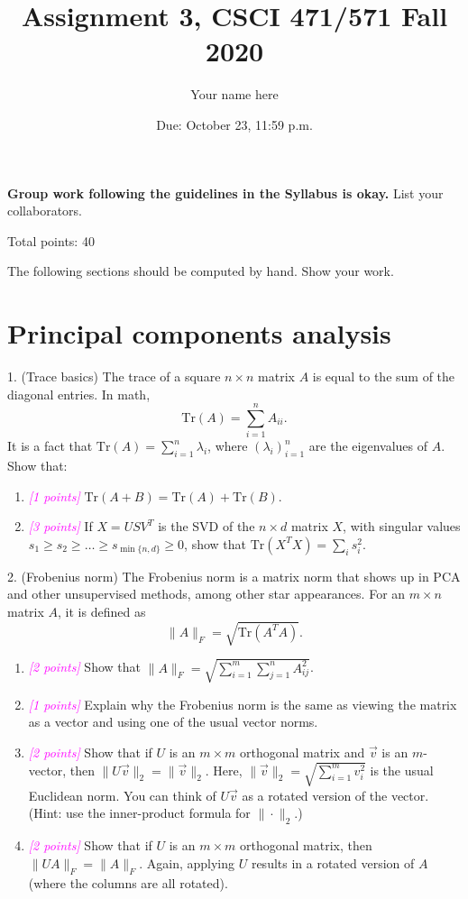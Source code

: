 \documentclass{article}
\title{Assignment 3, CSCI 471/571 Fall 2020}
\date{Due: October 23, 11:59 p.m.}
\author{Your name here}
\newcommand{\points}[1]{\small\textcolor{magenta}{\emph{[#1 points]}} \normalsize}
\begin{document}
\maketitle

{\bf Group work following the guidelines in the Syllabus is okay.}
List your collaborators.

Total points: 40

\vspace{1em}
The following sections should be computed by hand. Show your work.

\section*{Principal components analysis}

1. (Trace basics)
The trace of a square $n \times n$ matrix $A$ is equal to the
sum of the diagonal entries. In math,
$$
\mathrm{Tr}(A) = \sum_{i=1}^n A_{ii}.
$$
It is a fact that $\mathrm{Tr}(A) = \sum_{i=1}^n \lambda_i$,
where $(\lambda_i)_{i=1}^n$ are the eigenvalues of $A$.
Show that:
\begin{enumerate}
\item \points{1} $\mathrm{Tr}(A + B) = \mathrm{Tr}(A) + \mathrm{Tr}(B).$
\item \points{3} If $X = U S V^T$ is the SVD of the $n \times d$ matrix $X$,
  with singular values $s_1 \geq s_2 \geq \ldots \geq s_{\min\{n,d\}} \geq 0$,
  show that $\mathrm{Tr}(X^T X) = \sum_{i} s_i^2.$
\end{enumerate}

2. (Frobenius norm)
The Frobenius norm is a matrix norm that shows up in PCA and other unsupervised 
methods, among other star appearances. 
For an $m \times n$ matrix $A$, it is defined as 
$$
\|A\|_{F} = \sqrt{\mathrm{Tr}( A^T A)}.
$$
\begin{enumerate}
\item \points{2} Show that $\|A\|_F = \sqrt{\sum_{i=1}^m \sum_{j=1}^n A_{ij}^2}$.
\item \points{1} Explain why the Frobenius norm is the same as viewing the matrix as a vector 
and using one of the usual vector norms.
\item \points{2} Show that if $U$ is an $m \times m$ orthogonal matrix and $\vec v$ is an $m$-vector,
  then $\|U \vec v\|_2 = \| \vec v \|_2$. 
  Here, $\| \vec v \|_2 = \sqrt{\sum_{i=1}^m v_i^2}$ is the usual Euclidean norm.
  You can think of $U \vec v$ as a rotated version of the vector.
  (Hint: use the inner-product formula for $\| \cdot \|_2$.)
\item \points{2} Show that if $U$ is an $m \times m$ orthogonal matrix, then $\|U A \|_F = \| A \|_F$.
  Again, applying $U$ results in a rotated version of $A$ (where the columns are all rotated).
\end{enumerate}
\end{document}
